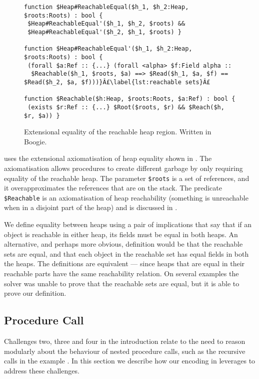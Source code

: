\documentclass[runningheads,a4paper]{llncs}
\begin{document}
\begin{figure}[tbp]
\begin{lstlisting}[style=Boogie,firstnumber=auto,name=copyex]
function $Heap#ReachableEqual($h_1, $h_2:Heap, $roots:Roots) : bool {
 $Heap#ReachableEqual'($h_1, $h_2, $roots) &&
 $Heap#ReachableEqual'($h_2, $h_1, $roots) }

function $Heap#ReachableEqual'($h_1, $h_2:Heap, $roots:Roots) : bool {
 (forall $a:Ref :: {...} (forall <alpha> $f:Field alpha ::
  $Reachable($h_1, $roots, $a) ==> $Read($h_1, $a, $f) == $Read($h_2, $a, $f)))}Â£\label{lst:reachable sets}Â£

function $Reachable($h:Heap, $roots:Roots, $a:Ref) : bool {
 (exists $r:Ref :: {...} $Root($roots, $r) && $Reach($h, $r, $a)) }
\end{lstlisting}
\caption{Extensional equality of the reachable heap region. Written in Boogie.}\label{fig:extensionality}
\end{figure}

\Tool{} uses the extensional axiomatisation of heap equality shown in . The axiomatisation allows procedures to create different garbage by only requiring equality of the reachable heap. The parameter \texttt{\$roots} is a set of references, and it overapproximates the references that are on the stack. The predicate \texttt{\$Reachable} is an axiomatisation of heap reachability (something is unreachable when in a disjoint part of the heap) and is discussed in .

We define equality between heaps using a pair of implications that say that if an object is reachable in either heap, its fields must be equal in both heaps. An alternative, and perhaps more obvious, definition would be that the reachable sets are equal, and that each object in the reachable set has equal fields in both the heaps. The definitions are equivalent --- since heaps that are equal in their reachable parts have the same reachability relation. On several examples the solver was unable to prove that the reachable sets are equal, but it is able to prove our definition.

\subsection{Procedure Call}\label{sec:recursion}

Challenges two, three and four in the introduction relate to the need to reason modularly about the behaviour of nested procedure calls, such as the recursive calls in the example . In this section we describe how our encoding in  leverages \metho{} to address these challenges.
\end{document}
